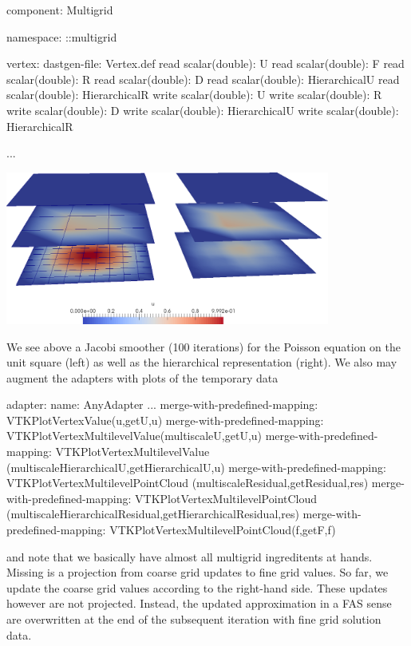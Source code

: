\begin{code}
component: Multigrid

namespace: ::multigrid

vertex:
  dastgen-file: Vertex.def
  read scalar(double): U
  read scalar(double): F
  read scalar(double): R
  read scalar(double): D
  read scalar(double): HierarchicalU
  read scalar(double): HierarchicalR
  write scalar(double): U
  write scalar(double): R
  write scalar(double): D
  write scalar(double): HierarchicalU
  write scalar(double): HierarchicalR

...
\end{code}

\begin{center}
  \includegraphics[width=0.8\textwidth]{42_matrix-free-multigrid/Hierarchical-Jacobi.png}
\end{center}

\noindent
We see above a Jacobi smoother (100 iterations) for the Poisson equation on the
unit square (left) as well as the hierarchical representation (right).
We also may augment the adapters with plots of the temporary data 

\begin{code}
adapter:
  name: AnyAdapter
  ...
  merge-with-predefined-mapping: VTKPlotVertexValue(u,getU,u)
  merge-with-predefined-mapping: VTKPlotVertexMultilevelValue(multiscaleU,getU,u)
  merge-with-predefined-mapping: VTKPlotVertexMultilevelValue
    (multiscaleHierarchicalU,getHierarchicalU,u)
  merge-with-predefined-mapping: VTKPlotVertexMultilevelPointCloud
    (multiscaleResidual,getResidual,res)
  merge-with-predefined-mapping: VTKPlotVertexMultilevelPointCloud
    (multiscaleHierarchicalResidual,getHierarchicalResidual,res)
  merge-with-predefined-mapping: VTKPlotVertexMultilevelPointCloud(f,getF,f)
\end{code}

\noindent
and note that we basically have almost all multigrid ingreditents at hands.
Missing is a projection from coarse grid updates to fine grid values.
So far, we update the coarse grid values according to the right-hand side.
These updates however are not projected.
Instead, the updated approximation in a FAS sense are overwritten at the end of
the subsequent iteration with fine grid solution data. 


